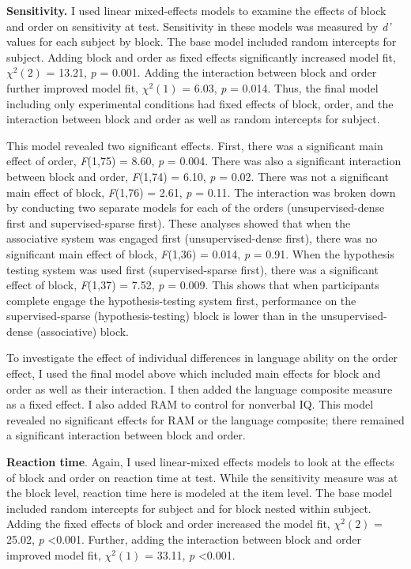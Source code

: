 \documentclass[../dissertation.tex]{subfiles}
\begin{document}
	\textbf{Sensitivity.} I used linear mixed-effects models to examine the effects of block and order on sensitivity at test. Sensitivity in these models was measured by \textit{d'} values for each subject by block. The base model included random intercepts for subject. Adding block and order as fixed effects significantly increased model fit, $\chi^{2}(2)$ = 13.21,  \textit{p} = 0.001. Adding the interaction between block and order further improved model fit, $\chi^{2}(1)$ = 6.03,  \textit{p} = 0.014. Thus, the final model including only experimental conditions had fixed effects of block, order, and the interaction between block and order as well as random intercepts for subject. \par
	This model revealed two significant effects. First, there was a significant main effect of order, \textit{F}(1,75) = 8.60, \textit{p} = 0.004. There was also a significant interaction between block and order, \textit{F}(1,74) = 6.10, \textit{p} = 0.02. There was not a significant main effect of block, \textit{F}(1,76) = 2.61, \textit{p} = 0.11. The interaction was broken down by conducting two separate models for each of the orders (unsupervised-dense first and supervised-sparse first). These analyses showed that when the associative system was engaged first (unsupervised-dense first), there was no significant main effect of block, \textit{F}(1,36) = 0.014, \textit{p} = 0.91. When the hypothesis testing system was used first (supervised-sparse first), there was a significant effect of block, \textit{F}(1,37) = 7.52, \textit{p} = 0.009. This shows that when participants complete engage the hypothesis-testing system first, performance on the supervised-sparse (hypothesis-testing) block is lower than in the unsupervised-dense (associative) block. \par
	To investigate the effect of individual differences in language ability on the order effect, I used the final model above which included main effects for block and order as well as their interaction. I then added  the language composite measure as a fixed effect. I also added RAM to control for nonverbal IQ. This model revealed no significant effects for RAM or the language composite; there remained a significant interaction between block and order. \par
	\textbf{Reaction time}. Again, I used linear-mixed effects models to look at the effects of block and order on reaction time at test. While the sensitivity measure was at the block level, reaction time here is modeled at the item level. The base model included random intercepts for subject and for block nested within subject. Adding the fixed effects of block and order increased the model fit, $\chi^{2}(2)$ = 25.02,  \textit{p} \textless 0.001. Further, adding the interaction between block and order improved model fit, $\chi^{2}(1)$ = 33.11,  \textit{p} \textless 0.001. \par
\end{document}
